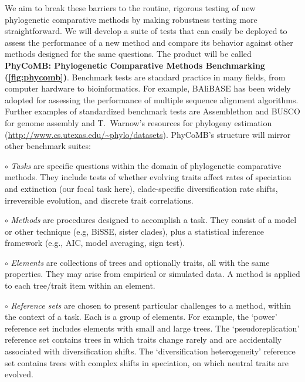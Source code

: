 We aim to break these barriers to the routine, rigorous testing of new phylogenetic comparative methods by making robustness testing more straightforward.
We will develop a suite of tests that can easily be deployed to assess the performance of a new method and compare its behavior against other methods designed for the same questions.
The product will be called \textbf{PhyCoMB: Phylogenetic Comparative Methods Benchmarking (\cref{fig:phycomb})}.
%
Benchmark tests are standard practice in many fields, from computer hardware to bioinformatics.
For example, BAliBASE \citep[the Benchmark Alignment dataBASE;][]{thompson1999, thompson2005} has been widely adopted for assessing the performance of multiple sequence alignment algorithms. %
Further examples of standardized benchmark tests are Assemblethon and BUSCO for genome assembly \citep{bradnam2013, simao2015} and T.~Warnow's resources for phylogeny estimation (\url{http://www.cs.utexas.edu/~phylo/datasets}).
%
PhyCoMB's structure will mirror other benchmark suites:

$\circ$ \textit{Tasks} are specific questions within the domain of phylogenetic comparative methods.
They include tests of whether evolving traits affect rates of speciation and extinction (our focal task here), clade-specific diversification rate shifts, irreversible evolution, and discrete trait correlations.

$\circ$ \textit{Methods} are procedures designed to accomplish a task.
They consist of a model or other technique (e.g, BiSSE, sister clades), plus a statistical inference framework (e.g., AIC, model averaging, sign test).

$\circ$ \textit{Elements} are collections of trees and optionally traits, all with the same properties. 
They may arise from empirical or simulated data.
A method is applied to each tree/trait item within an element.

$\circ$ \textit{Reference sets} are chosen to present particular challenges to a method, within the context of a task.
Each is a group of elements.
For example, the `power' reference set includes elements with small and large trees.
The `pseudoreplication' reference set contains trees in which traits change rarely and are accidentally associated with diversification shifts. 
The `diversification heterogeneity' reference set contains trees with complex shifts in speciation, on which neutral traits are evolved.

